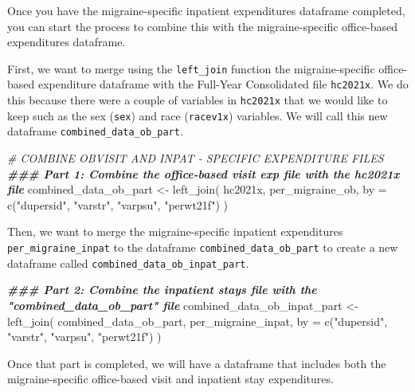 \documentclass[
]{book}
\newenvironment{Shaded}{\begin{snugshade}}{\end{snugshade}}
\newcommand{\AttributeTok}[1]{\textcolor[rgb]{0.77,0.63,0.00}{#1}}
\newcommand{\CommentTok}[1]{\textcolor[rgb]{0.56,0.35,0.01}{\textit{#1}}}
\newcommand{\DocumentationTok}[1]{\textcolor[rgb]{0.56,0.35,0.01}{\textbf{\textit{#1}}}}
\newcommand{\FunctionTok}[1]{\textcolor[rgb]{0.00,0.00,0.00}{#1}}
\newcommand{\NormalTok}[1]{#1}
\newcommand{\OtherTok}[1]{\textcolor[rgb]{0.56,0.35,0.01}{#1}}
\newcommand{\StringTok}[1]{\textcolor[rgb]{0.31,0.60,0.02}{#1}}
\begin{document}
Once you have the migraine-specific inpatient expenditures dataframe completed, you can start the process to combine this with the migraine-specific office-based expenditures dataframe.

First, we want to merge using the \texttt{left\_join} function the migraine-specific office-based expenditure dataframe with the Full-Year Consolidated file \texttt{hc2021x}. We do this because there were a couple of variables in \texttt{hc2021x} that we would like to keep such as the sex (\texttt{sex}) and race (\texttt{racev1x}) variables. We will call this new dataframe \texttt{combined\_data\_ob\_part}.

\begin{Shaded}
\begin{Highlighting}[]
\CommentTok{\# COMBINE OBVISIT AND INPAT {-} SPECIFIC EXPENDITURE FILES}
\DocumentationTok{\#\#\# Part 1: Combine the office{-}based visit exp file with the hc2021x file}
\NormalTok{combined\_data\_ob\_part }\OtherTok{\textless{}{-}} \FunctionTok{left\_join}\NormalTok{(}
\NormalTok{  hc2021x, }
\NormalTok{  per\_migraine\_ob,}
  \AttributeTok{by =} \FunctionTok{c}\NormalTok{(}\StringTok{"dupersid"}\NormalTok{, }\StringTok{"varstr"}\NormalTok{, }\StringTok{"varpsu"}\NormalTok{, }\StringTok{"perwt21f"}\NormalTok{)}
\NormalTok{)}
\end{Highlighting}
\end{Shaded}

Then, we want to merge the migraine-specific inpatient expenditures \texttt{per\_migraine\_inpat} to the dataframe \texttt{combined\_data\_ob\_part} to create a new dataframe called \texttt{combined\_data\_ob\_inpat\_part}.

\begin{Shaded}
\begin{Highlighting}[]
\DocumentationTok{\#\#\# Part 2: Combine the inpatient stays file with the "combined\_data\_ob\_part" file}
\NormalTok{combined\_data\_ob\_inpat\_part }\OtherTok{\textless{}{-}} \FunctionTok{left\_join}\NormalTok{(}
\NormalTok{  combined\_data\_ob\_part, }
\NormalTok{  per\_migraine\_inpat,}
  \AttributeTok{by =} \FunctionTok{c}\NormalTok{(}\StringTok{"dupersid"}\NormalTok{, }\StringTok{"varstr"}\NormalTok{, }\StringTok{"varpsu"}\NormalTok{, }\StringTok{"perwt21f"}\NormalTok{)}
\NormalTok{)}
\end{Highlighting}
\end{Shaded}

Once that part is completed, we will have a dataframe that includes both the migraine-specific office-based visit and inpatient stay expenditures.
\end{document}
